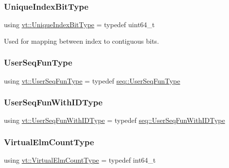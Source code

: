 \subsubsection{\texorpdfstring{Unique\+Index\+Bit\+Type}{UniqueIndexBitType}}
{\footnotesize\ttfamily using \hyperlink{namespacevt_a913e1f07b5228dd8bb64040dc6dcea14}{vt\+::\+Unique\+Index\+Bit\+Type} = typedef uint64\+\_\+t}



Used for mapping between index to contiguous bits. 

\mbox{\label{namespacevt_affe11140b7cc6953030f1f158b40750c}} 
\subsubsection{\texorpdfstring{User\+Seq\+Fun\+Type}{UserSeqFunType}}
{\footnotesize\ttfamily using \hyperlink{namespacevt_affe11140b7cc6953030f1f158b40750c}{vt\+::\+User\+Seq\+Fun\+Type} = typedef \hyperlink{namespacevt_1_1seq_aeb4674d25dcb5d27248b68ec83fad2b6}{seq\+::\+User\+Seq\+Fun\+Type}}

\mbox{\label{namespacevt_a3170103960b4d8f8a0f722750bc0dcc9}} 
\subsubsection{\texorpdfstring{User\+Seq\+Fun\+With\+I\+D\+Type}{UserSeqFunWithIDType}}
{\footnotesize\ttfamily using \hyperlink{namespacevt_a3170103960b4d8f8a0f722750bc0dcc9}{vt\+::\+User\+Seq\+Fun\+With\+I\+D\+Type} = typedef \hyperlink{namespacevt_1_1seq_a1a58d0ebe1d6bbed8438607a9c717779}{seq\+::\+User\+Seq\+Fun\+With\+I\+D\+Type}}

\mbox{\label{namespacevt_ac115668758184050beff7a9281a2c490}} 
\subsubsection{\texorpdfstring{Virtual\+Elm\+Count\+Type}{VirtualElmCountType}}
{\footnotesize\ttfamily using \hyperlink{namespacevt_ac115668758184050beff7a9281a2c490}{vt\+::\+Virtual\+Elm\+Count\+Type} = typedef int64\+\_\+t}



